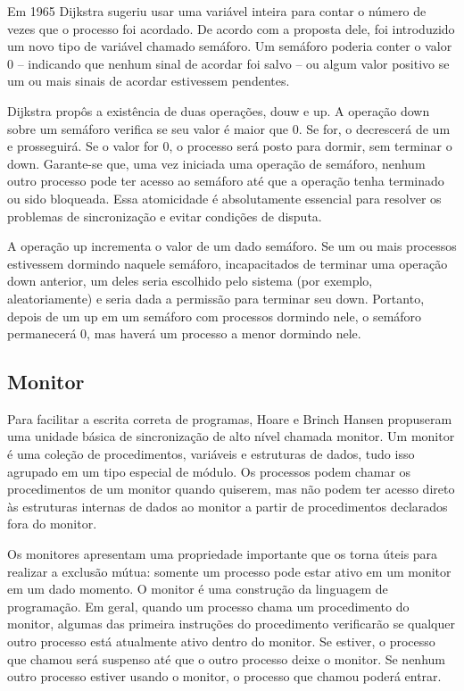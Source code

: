 Em 1965 Dijkstra sugeriu usar uma variável inteira para contar o número de vezes que o 
processo foi acordado. De acordo com a proposta dele, foi introduzido um novo tipo de 
variável chamado semáforo. Um semáforo poderia conter o valor 0 – indicando que nenhum 
sinal de acordar foi salvo – ou algum valor positivo se um ou mais sinais de acordar 
estivessem pendentes.

Dijkstra propôs a existência de duas operações,  douw e up. A operação down sobre um 
semáforo verifica se seu valor é maior que 0. Se for, o decrescerá de um e prosseguirá. 
Se o valor for 0, o processo será posto para dormir, sem terminar o down. Garante-se que, 
uma vez iniciada uma operação de semáforo, nenhum outro processo pode ter acesso ao 
semáforo até que a operação tenha terminado ou sido bloqueada. Essa atomicidade é 
absolutamente essencial para resolver os problemas de sincronização e evitar condições 
de disputa.

A operação up incrementa o valor de um dado semáforo. Se um ou mais processos estivessem 
dormindo naquele semáforo, incapacitados de terminar uma operação down anterior, um deles 
seria escolhido pelo sistema (por exemplo, aleatoriamente) e seria dada a permissão para 
terminar seu down. Portanto, depois de um up em um semáforo com processos dormindo nele, 
o semáforo permanecerá 0, mas haverá um processo a menor dormindo nele.

\subsection{Monitor}

Para facilitar a escrita correta de programas, Hoare e Brinch Hansen propuseram uma unidade 
básica de sincronização de alto nível chamada monitor.  Um monitor é uma coleção de procedimentos, 
variáveis e estruturas de dados, tudo isso agrupado em um tipo especial de módulo. Os processos 
podem chamar os procedimentos de um monitor quando quiserem, mas não podem ter acesso direto às 
estruturas internas de dados ao monitor a partir de procedimentos declarados fora do monitor.

Os monitores apresentam uma propriedade importante que os torna úteis para realizar a exclusão mútua: 
somente um processo pode estar ativo em um monitor em um dado momento. O monitor é uma construção da 
linguagem de programação. Em geral, quando um processo chama um procedimento do monitor, algumas das 
primeira instruções do procedimento verificarão  se qualquer outro processo está atualmente ativo 
dentro do monitor. Se estiver, o processo que chamou será suspenso até que o outro processo deixe o 
monitor. Se nenhum outro processo estiver usando o monitor, o processo que chamou poderá entrar.

